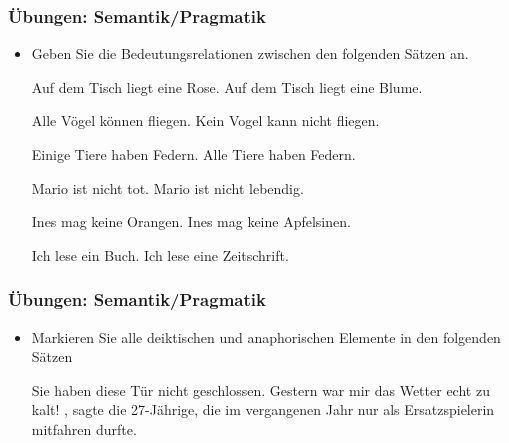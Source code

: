 \begin{frame}
\frametitle{Übungen: Semantik/Pragmatik}

\begin{itemize}
	\item Geben Sie die Bedeutungsrelationen zwischen den folgenden Sätzen an.
	
	\eal 
	\ex Auf dem Tisch liegt eine Rose.
	\ex Auf dem Tisch liegt eine Blume.
	\zl
	
	\eal 
	\ex Alle Vögel können fliegen.
	\ex Kein Vogel kann nicht fliegen.
	\zl
	
	\eal 
	\ex Einige Tiere haben Federn.
	\ex Alle Tiere haben Federn.
	\zl
	
	\eal 
	\ex Mario ist nicht tot.
	\ex Mario ist nicht lebendig.
	\zl
	
	\eal 
	\ex Ines mag keine Orangen.
	\ex Ines mag keine Apfelsinen.
	\zl
	
	\eal 
	\ex Ich lese ein Buch.
	\ex Ich lese eine Zeitschrift.
	\zl
	
\end{itemize}

\end{frame}


\begin{frame}
\frametitle{Übungen: Semantik/Pragmatik}

\begin{itemize}
	\item Markieren Sie alle deiktischen und anaphorischen Elemente in den folgenden Sätzen
	
	\eal
	\ex Sie haben diese Tür nicht geschlossen.
	\ex Gestern war mir das Wetter echt zu kalt!
	\ex {}, sagte die 27-Jährige, die im vergangenen Jahr nur als Ersatzspielerin mitfahren durfte.
	\zl
	
\end{itemize}

\end{frame}


